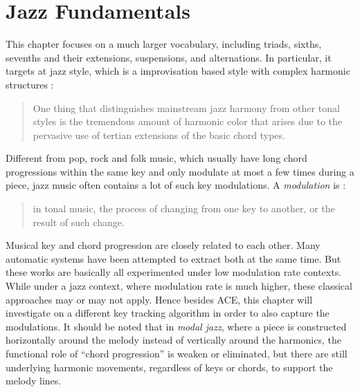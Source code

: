 \section{Jazz Fundamentals} \label{sec:5-jazzfund}
This chapter focuses on a much larger vocabulary, including triads, sixths, sevenths and their extensions, suspensions, and alternations. In particular, it targets at jazz style, which is a improvisation based style with complex harmonic structures \cite{hojnackijazz}:
\begin{quote}
One thing that distinguishes mainstream jazz harmony from other tonal styles is the tremendous amount of harmonic color that arises due to the pervasive use of tertian extensions of the basic chord types.
\end{quote}
Different from pop, rock and folk music, which usually have long chord progressions within the same key and only modulate at most a few times during a piece, jazz music often contains a lot of such key modulations. A {\it modulation} is \cite{randel1999harvard}:
\begin{quote}
in tonal music, the process of changing from one key to another, or the result of such change.
\end{quote}
Musical key and chord progression are closely related to each other. Many automatic systems \cite{catteau2007probabilistic,noland2009influences,mauch2010simultaneous} have been attempted to extract both at the same time. But these works are basically all experimented under low modulation rate contexts. While under a jazz context, where modulation rate is much higher, these classical approaches may or may not apply. Hence besides ACE, this chapter will investigate on a different key tracking algorithm in order to also capture the modulations. It should be noted that in {\it modal jazz}, where a piece is constructed horizontally around the melody instead of vertically around the harmonics, the functional role of ``chord progression'' is weaken or eliminated, but there are still underlying harmonic movements, regardless of keys or chords, to support the melody lines.

